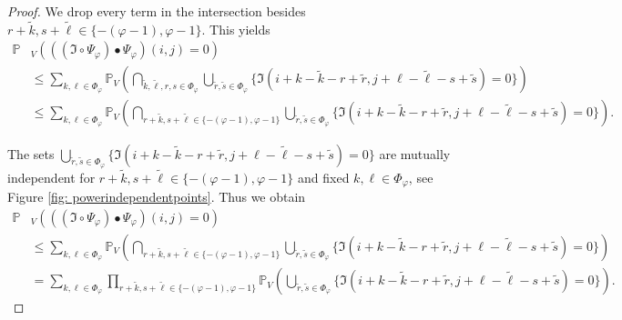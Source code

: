 \documentclass[a4paper,12pt]{article}
\theoremstyle{plain}
\theoremstyle{definition}
\numberwithin{equation}{section}
\begin{document}
\begin{appendix}
\begin{proof}
		We drop every term in the intersection besides $r + \tilde{k}, s + \tilde{\ell} \in \{ - ( \varphi - 1 ), \varphi - 1 \}$. This yields
		\begin{align*}
			\mathbb{P}&_V\left( ((\mathfrak{I} \circ \Psi_\varphi) \bullet \Psi_\varphi)(i, j) = 0 \right) \\
			&\leq \sum_{k, \ell \in \Phi_\varphi} \mathbb{P}_V\left( \bigcap_{\tilde{k}, \tilde{\ell}, r, s \in \Phi_\varphi} \bigcup_{\tilde{r}, \tilde{s} \in \Phi_\varphi} \{ \mathfrak{I}(i + k - \tilde{k} - r + \tilde{r}, j + \ell - \tilde{\ell} - s + \tilde{s}) = 0 \} \right) \\
			&\leq \sum_{k, \ell \in \Phi_\varphi} \mathbb{P}_V\left( \bigcap_{r + \tilde{k}, s + \tilde{\ell} \in \{ - ( \varphi - 1 ), \varphi - 1 \}} \bigcup_{\tilde{r}, \tilde{s} \in \Phi_\varphi} \{ \mathfrak{I}(i + k - \tilde{k} - r + \tilde{r}, j + \ell - \tilde{\ell} - s + \tilde{s}) = 0 \} \right).
		\end{align*}
		
		
		
		The sets $\bigcup_{\tilde{r}, \tilde{s} \in \Phi_\varphi} \{ \mathfrak{I}(i + k - \tilde{k} - r + \tilde{r}, j + \ell - \tilde{\ell} - s + \tilde{s}) = 0 \}$ are mutually independent for $r + \tilde{k}, s + \tilde{\ell} \in \{ - ( \varphi - 1 ), \varphi - 1 \}$ and fixed $k, \ell \in \Phi_\varphi$, see Figure \ref{fig: powerindependentpoints}. Thus we obtain
		\begin{align*}
			\mathbb{P}&_V\left( ((\mathfrak{I} \circ \Psi_\varphi) \bullet \Psi_\varphi)(i, j) = 0 \right) \\
			&\leq \sum_{k, \ell \in \Phi_\varphi} \mathbb{P}_V\left( \bigcap_{r + \tilde{k}, s + \tilde{\ell} \in \{ - ( \varphi - 1 ), \varphi - 1 \}} \bigcup_{\tilde{r}, \tilde{s} \in \Phi_\varphi} \{ \mathfrak{I}(i + k - \tilde{k} - r + \tilde{r}, j + \ell - \tilde{\ell} - s + \tilde{s}) = 0 \} \right) \\
			&= \sum_{k, \ell \in \Phi_\varphi} \prod_{r + \tilde{k}, s + \tilde{\ell} \in \{ - ( \varphi - 1 ), \varphi - 1 \}} \mathbb{P}_V\left( \bigcup_{\tilde{r}, \tilde{s} \in \Phi_\varphi} \{ \mathfrak{I}(i + k - \tilde{k} - r + \tilde{r}, j + \ell - \tilde{\ell} - s + \tilde{s}) = 0 \} \right).
		\end{align*}
		

\end{proof}
\end{appendix}
\end{document}
